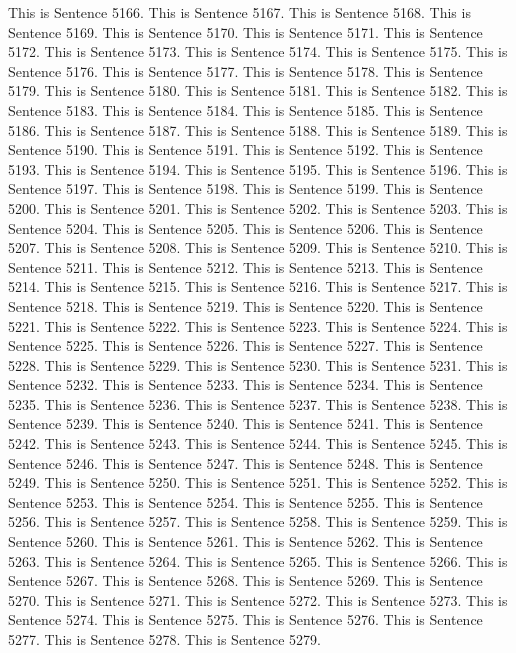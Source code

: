 \documentclass{article}
\begin{document}
This is Sentence 5166.
This is Sentence 5167.
This is Sentence 5168.
This is Sentence 5169.
This is Sentence 5170.
This is Sentence 5171.
This is Sentence 5172.
This is Sentence 5173.
This is Sentence 5174.
This is Sentence 5175.
This is Sentence 5176.
This is Sentence 5177.
This is Sentence 5178.
This is Sentence 5179.
This is Sentence 5180.
This is Sentence 5181.
This is Sentence 5182.
This is Sentence 5183.
This is Sentence 5184.
This is Sentence 5185.
This is Sentence 5186.
This is Sentence 5187.
This is Sentence 5188.
This is Sentence 5189.
This is Sentence 5190.
This is Sentence 5191.
This is Sentence 5192.
This is Sentence 5193.
This is Sentence 5194.
This is Sentence 5195.
This is Sentence 5196.
This is Sentence 5197.
This is Sentence 5198.
This is Sentence 5199.
This is Sentence 5200.
This is Sentence 5201.
This is Sentence 5202.
This is Sentence 5203.
This is Sentence 5204.
This is Sentence 5205.
This is Sentence 5206.
This is Sentence 5207.
This is Sentence 5208.
This is Sentence 5209.
This is Sentence 5210.
This is Sentence 5211.
This is Sentence 5212.
This is Sentence 5213.
This is Sentence 5214.
This is Sentence 5215.
This is Sentence 5216.
This is Sentence 5217.
This is Sentence 5218.
This is Sentence 5219.
This is Sentence 5220.
This is Sentence 5221.
This is Sentence 5222.
This is Sentence 5223.
This is Sentence 5224.
This is Sentence 5225.
This is Sentence 5226.
This is Sentence 5227.
This is Sentence 5228.
This is Sentence 5229.
This is Sentence 5230.
This is Sentence 5231.
This is Sentence 5232.
This is Sentence 5233.
This is Sentence 5234.
This is Sentence 5235.
This is Sentence 5236.
This is Sentence 5237.
This is Sentence 5238.
This is Sentence 5239.
This is Sentence 5240.
This is Sentence 5241.
This is Sentence 5242.
This is Sentence 5243.
This is Sentence 5244.
This is Sentence 5245.
This is Sentence 5246.
This is Sentence 5247.
This is Sentence 5248.
This is Sentence 5249.
This is Sentence 5250.
This is Sentence 5251.
This is Sentence 5252.
This is Sentence 5253.
This is Sentence 5254.
This is Sentence 5255.
This is Sentence 5256.
This is Sentence 5257.
This is Sentence 5258.
This is Sentence 5259.
This is Sentence 5260.
This is Sentence 5261.
This is Sentence 5262.
This is Sentence 5263.
This is Sentence 5264.
This is Sentence 5265.
This is Sentence 5266.
This is Sentence 5267.
This is Sentence 5268.
This is Sentence 5269.
This is Sentence 5270.
This is Sentence 5271.
This is Sentence 5272.
This is Sentence 5273.
This is Sentence 5274.
This is Sentence 5275.
This is Sentence 5276.
This is Sentence 5277.
This is Sentence 5278.
This is Sentence 5279.
\end{document}
